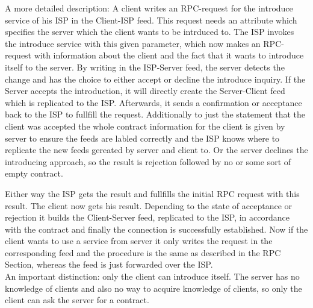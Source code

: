A more detailed description: A client writes an RPC-request for the introduce service of his ISP in the Client-ISP feed. This request needs an attribute which specifies the server which the client wants to be intrduced to. The ISP invokes the introduce service with this given parameter, which now makes an RPC-request with information about the client and the fact that it wants to introduce itself to the server. By writing in the ISP-Server feed, the server detects the change and has the choice to either accept or decline the introduce inquiry. If the Server accepts the introduction, it will directly create the Server-Client feed which is replicated to the ISP. Afterwards, it sends a confirmation or acceptance back to the ISP to fullfill the request. Additionally to just the statement that the client was accepted the whole contract information for the client is given by server to ensure the feeds are labled correctly and the ISP knows where to replicate the new feeds gereated by server and client to. 
Or the server declines the introducing approach, so the result is rejection followed by no or some sort of empty contract.

Either way the ISP gets the result and fullfills the initial RPC request with this result. The client now gets his result. Depending to the state of acceptance or rejection it builds the Client-Server feed, replicated to the ISP, in accordance with the contract and finally the connection is successfully established. Now if the client wants to use a service from server it only writes the request in the corresponding feed and the procedure is the same as described in the RPC Section, whereas the feed is just forwarded over the ISP.
\\
An important distinction: only the client can introduce itself. The server has no knowledge of clients and also no way to acquire knowledge of clients, so only the client can ask the server for a contract. 

